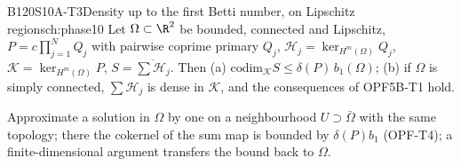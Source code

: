\begin{dimcard}{B120}{S10A-T3}{Density up to the first Betti number, on Lipschitz regions}{\modulo{[F1], [F2]}}{ch:phase10}
Let $\Omega\subset\R^2$ be bounded, connected and Lipschitz, $P=c\prod_{j=1}^NQ_j$ with pairwise coprime primary $Q_j$, $\mathcal H_j=\ker_{H^m(\Omega)}Q_j$, $\mathcal K=\ker_{H^m(\Omega)}P$, $S=\overline{\sum\mathcal H_j}$. Then (a) $\mathrm{codim}_{\mathcal K}S\le\delta(P)\,b_1(\Omega)$; (b) if $\Omega$ is simply connected, $\sum\mathcal H_j$ is dense in $\mathcal K$, and the consequences of OPF5B-T1 hold.
\end{dimcard}

\begin{proofidea}
Approximate a solution in $\Omega$ by one on a neighbourhood $U\supset\bar\Omega$ with the same topology; there the cokernel of the sum map is bounded by $\delta(P)b_1$ (OPF-T4); a finite-dimensional argument transfers the bound back to $\Omega$.
\end{proofidea}

